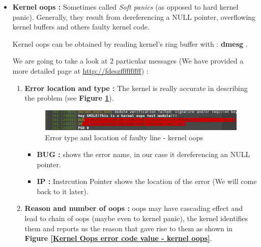 \begin{itemize}
	\item \textbf{Kernel oops : } Sometimes called \emph{Soft panics} (as opposed to hard kernel panic). Generally, they result from dereferencing a NULL pointer, overflowing kernel buffers and others faulty kernel code.\\
\vspace{5px}	


\begin{center}
\begin{mdframed}[
        linecolor=red,linewidth=2pt,%
        frametitlerule=true,%
        apptotikzsetting={\tikzset{mdfframetitlebackground/.append style={%
            shade,left color=white, right color=blue!20}}}, 
        frametitlerulecolor=blue,
        frametitlerulewidth=1pt, innertopmargin=\topskip,
        frametitle={Reading Kernel Oop},
        outerlinewidth=1.25pt
    ]
Kernel oops can be obtained by reading kernel's ring buffer with : \og \textbf{dmesg} \fg.
\end{mdframed}
\end{center}
	
\vspace{6px}	
We are going to take a look at 2 particular messages (We have provided a more detailed page at {\color{blue}\url{http://fdeszffffffffff}}) : 	

	\begin{enumerate}
		\item \textbf{Error location and type : } The kernel is really accurate in describing the problem (see \textbf{Figure \ref{Error type and location of faulty line - kernel oops}}).
		
\begin{figure}[H]
		\centering
        \includegraphics[scale=0.35]{img/solution/oops-error-kernel.png}
        \caption{Error type and location of faulty line - kernel oops}
        \label{Error type and location of faulty line - kernel oops}
    \end{figure}		
		
		
			\begin{itemize}
				\item \textbf{BUG : } shows the error name, in our case it \og dereferencing an NULL pointer\fg.				
				\item \textbf{IP : } Instrcution Pointer shows the location of the error (We will come back to it later).
			\end{itemize}					
		\item \textbf{Reason and number of oops : } oops may have cascading effect and lead to chain of oops (maybe even to kernel panic), the kernel identifies them and reports us the reason that gave rise to them as shown in \textbf{Figure \ref{Kernel Oops error code value - kernel oops}}.


\end{enumerate}
\end{itemize}
